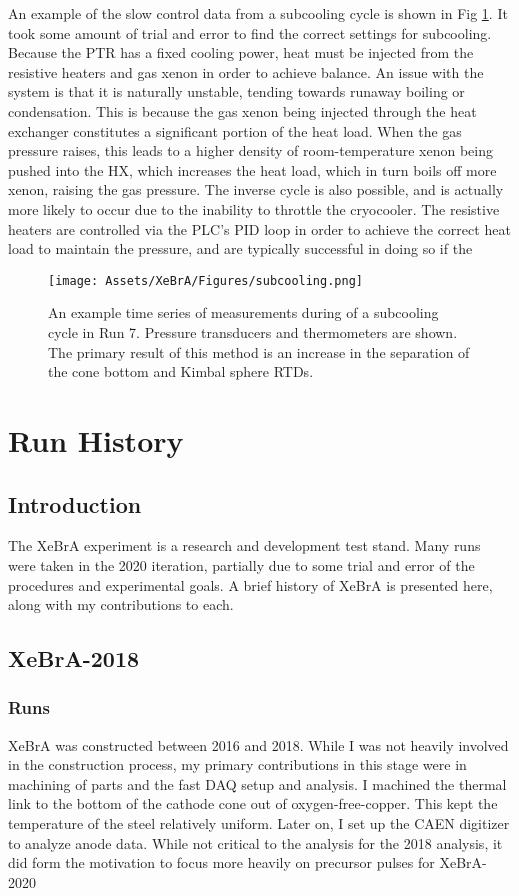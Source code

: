 An example of the slow control data from a subcooling cycle is shown in Fig \ref{fig:subcooling}.
It took some amount of trial and error to find the correct settings for subcooling.
Because the PTR has a fixed cooling power, heat must be injected from the resistive heaters and gas xenon in order to achieve balance.
An issue with the system is that it is naturally unstable, tending towards runaway boiling or condensation.
This is because the gas xenon being injected through the heat exchanger constitutes a significant portion of the heat load.
When the gas pressure raises, this leads to a higher density of room-temperature xenon being pushed into the HX, which increases the heat load, which in turn boils off more xenon, raising the gas pressure.
The inverse cycle is also possible, and is actually more likely to occur due to the inability to throttle the cryocooler.
The resistive heaters are controlled via the PLC's PID loop in order to achieve the correct heat load to maintain the pressure, and are typically successful in doing so if the 

\begin{figure} 
    \centering
    \texttt{[image: Assets/XeBrA/Figures/subcooling.png]}
    \caption[An example time series of measurements during of a subcooling cycle in Run 7. ]%
    {An example time series of measurements during of a subcooling cycle in Run 7. 
    Pressure transducers and thermometers are shown.
    The primary result of this method is an increase in the separation of the cone bottom and Kimbal sphere RTDs.}
    \label{fig:subcooling}
\end{figure}

\section{Run History}
\label{sec:history}
\subsection{Introduction}
The XeBrA experiment is a research and development test stand.
Many runs were taken in the 2020 iteration, partially due to some trial and error of the procedures and experimental goals.
A brief history of XeBrA is presented here, along with my contributions to each.

\subsection{XeBrA-2018}
\subsubsection{Runs}
XeBrA was constructed between 2016 and 2018.
While I was not heavily involved in the construction process, my primary contributions in this stage were in machining of parts and the fast DAQ setup and analysis.
I machined the thermal link to the bottom of the cathode cone out of oxygen-free-copper.
This kept the temperature of the steel relatively uniform.
Later on, I set up the CAEN digitizer to analyze anode data.
While not critical to the analysis for the 2018 analysis, it did form the motivation to focus more heavily on precursor pulses for XeBrA-2020

